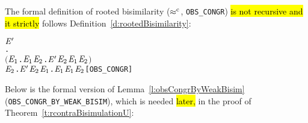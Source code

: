 The formal definition of rooted bisimilarity ($\mathrel{\approx^{\rm{c}}}$, \texttt{OBS_CONGR}) 
\hl{is not recursive and it strictly} follows Definition~\ref{d:rootedBisimilarity}:
\begin{alltt}
    \HOLSymConst{\HOLTokenObsCongr} \ensuremath{\HOLFreeVar{E}\sp{\prime}} \HOLTokenDefEquality{}
     \HOLSymConst{\HOLTokenForall{}}.
         \ensuremath{(}\HOLSymConst{\HOLTokenForall{}}\ensuremath{\HOLBoundVar{E}\sb{\mathrm{1}}}.  \HOLTokenTransBegin{}\HOLTokenTransEnd \ensuremath{\HOLBoundVar{E}\sb{\mathrm{1}}} \HOLSymConst{\HOLTokenImp{}} \HOLSymConst{\HOLTokenExists{}}\ensuremath{\HOLBoundVar{E}\sb{\mathrm{2}}}. \ensuremath{\HOLFreeVar{E}\sp{\prime}} \HOLTokenWeakTransBegin{}\HOLTokenWeakTransEnd \ensuremath{\HOLBoundVar{E}\sb{\mathrm{2}}} \HOLSymConst{\HOLTokenConj{}} \ensuremath{\HOLBoundVar{E}\sb{\mathrm{1}}} \HOLSymConst{\HOLTokenWeakEQ} \ensuremath{\HOLBoundVar{E}\sb{\mathrm{2}}}\ensuremath{)} \HOLSymConst{\HOLTokenConj{}}
         \HOLSymConst{\HOLTokenForall{}}\ensuremath{\HOLBoundVar{E}\sb{\mathrm{2}}}. \ensuremath{\HOLFreeVar{E}\sp{\prime}} \HOLTokenTransBegin{}\HOLTokenTransEnd \ensuremath{\HOLBoundVar{E}\sb{\mathrm{2}}} \HOLSymConst{\HOLTokenImp{}} \HOLSymConst{\HOLTokenExists{}}\ensuremath{\HOLBoundVar{E}\sb{\mathrm{1}}}.  \HOLTokenWeakTransBegin{}\HOLTokenWeakTransEnd \ensuremath{\HOLBoundVar{E}\sb{\mathrm{1}}} \HOLSymConst{\HOLTokenConj{}} \ensuremath{\HOLBoundVar{E}\sb{\mathrm{1}}} \HOLSymConst{\HOLTokenWeakEQ} \ensuremath{\HOLBoundVar{E}\sb{\mathrm{2}}}\hfill{[OBS_CONGR]}
\end{alltt}
Below is the formal version of Lemma~\ref{l:obsCongrByWeakBisim}
(\texttt{OBS_CONGR_BY_WEAK_BISIM}), which is needed \hl{later,} in the proof
of Theorem~\ref{t:rcontraBisimulationU}:
